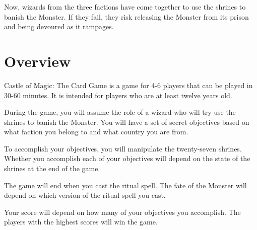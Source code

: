 \documentclass[10pt, parskip=half-, twoside]{scrartcl}
\begin{document}
Now, wizards from the three factions have come together to use the shrines to banish the Monster.
If they fail, they risk releasing the Monster from its prison and being devoured as it rampages.

\newpage

\section*{Overview}
Castle of Magic: The Card Game is a game for 4-6 players that can be played in 30-60 minutes. It is intended for players who are at least twelve years old.

During the game, you will assume the role of a wizard who will try use the shrines to banish the Monster. You will have a set of secret objectives based on what faction you belong to and what country you are from.

To accomplish your objectives, you will manipulate the twenty-seven shrines. Whether you accomplish each of your objectives will depend on the state of the shrines at the end of the game.

The game will end when you cast the ritual spell. The fate of the Monster will depend on which version of the ritual spell you cast.

Your score will depend on how many of your objectives you accomplish. The players with the highest scores will win the game.

\newpage
\end{document}
